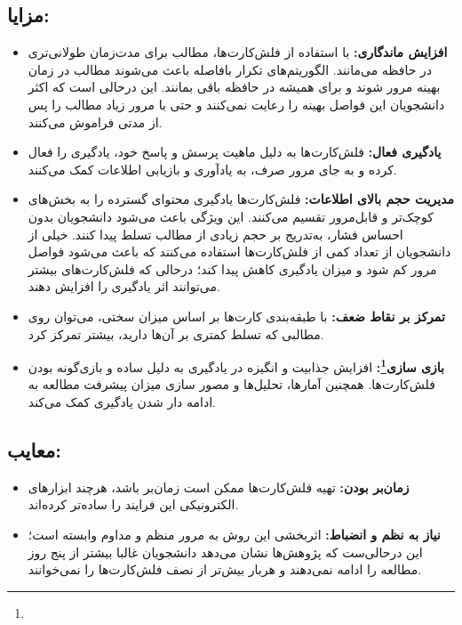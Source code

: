 \documentclass[12pt]{report}
\begin{document}
\subsection*{مزایا:}
\begin{itemize}
    \item \textbf{افزایش ماندگاری:} با استفاده از فلش‌کارت‌ها، مطالب برای مدت‌زمان طولانی‌تری در حافظه می‌مانند.
    الگوریتم‌های تکرار بافاصله باعث می‌شوند مطالب در زمان بهینه مرور شوند و برای همیشه در حافظه باقی بمانند.
    این درحالی است که اکثر دانشجویان این فواصل بهینه را رعایت نمی‌کنند و حتی با مرور زیاد مطالب را پس از مدتی فراموش می‌کنند.\cite{how}
    \item \textbf{یادگیری فعال:} فلش‌کارت‌ها به دلیل ماهیت پرسش و پاسخ خود، یادگیری را فعال کرده و به جای مرور صرف، به یادآوری و بازیابی اطلاعات کمک می‌کنند.
    \item \textbf{مدیریت حجم بالای اطلاعات:}
    فلش‌کارت‌ها یادگیری محتوای گسترده را به بخش‌های کوچک‌تر و قابل‌مرور تقسیم می‌کنند. این ویژگی باعث می‌شود دانشجویان بدون احساس فشار، به‌تدریج بر حجم زیادی از مطالب تسلط پیدا کنند.
    خیلی از دانشجویان از تعداد کمی از فلش‌کارت‌ها استفاده می‌کنند که باعث می‌شود فواصل مرور کم شود و میزان یادگیری کاهش پیدا کند؛
    درحالی که فلش‌کارت‌های بیشتر می‌توانند اثر یادگیری را افزایش دهند.\cite{how}
    \item \textbf{تمرکز بر نقاط ضعف:} با طبقه‌بندی کارت‌ها بر اساس میزان سختی، می‌توان روی مطالبی که تسلط کمتری بر آن‌ها دارید، بیشتر تمرکز کرد.
    \item \textbf{بازی سازی\footnote{}:} افزایش جذابیت و انگیزه در یادگیری به دلیل ساده 
    و بازی‌گونه بودن فلش‌کارت‌ها.
     همچنین آمارها، تحلیل‌ها و مصور سازی
      میزان پیشرفت مطالعه به ادامه دار شدن یادگیری کمک می‌کند.
\end{itemize}

\subsection*{معایب:}
\begin{itemize}
    \item \textbf{زمان‌بر بودن:} تهیه فلش‌کارت‌ها ممکن است زمان‌بر باشد، هرچند ابزارهای الکترونیکی این فرایند را ساده‌تر کرده‌اند.
    \item \textbf{نیاز به نظم و انضباط:} اثربخشی این روش به مرور منظم و مداوم وابسته است؛
        این درحالی‌ست که پژوهش‌ها نشان می‌دهد دانشجویان غالبا بیشتر از پنج روز مطالعه را ادامه نمی‌دهند
        و هربار بیش‌تر از نصف فلش‌کارت‌ها را نمی‌خوانند.\cite{karl}
\end{itemize}
\end{document}
